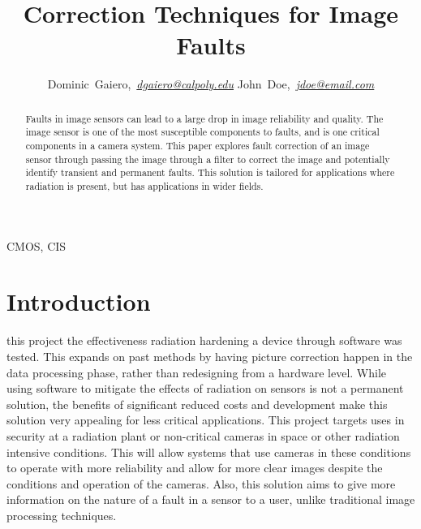 \documentclass[journal]{IEEEtran}
\begin{document}
\title{Correction Techniques for Image Faults}

\author{Dominic~Gaiero,~\textit{\href{mailto:dgaiero@calpoly.edu}{dgaiero@calpoly.edu}}
        John~Doe,~\textit{\href{mailto:jdoe@email.com}{jdoe@email.com}}}

\maketitle

\begin{abstract}
Faults in image sensors can lead to a large drop in image reliability and quality.  The image sensor is one of the most susceptible components to faults, and is one critical components in a camera system.  This paper explores fault correction of an image sensor through passing the image through a filter to correct the image and potentially identify transient and permanent faults.  This solution is tailored for applications where radiation is present, but has applications in wider fields.  
\end{abstract}



\begin{IEEEkeywords}
CMOS, CIS
\end{IEEEkeywords}

\section{Introduction}%
 this project the effectiveness radiation hardening a device through software was tested.  This expands on past methods by having picture correction happen in the data processing phase, rather than redesigning from a hardware level. While using software to mitigate the effects of radiation on sensors is not a permanent solution, the benefits of significant reduced costs and development make this solution very appealing for less critical applications. This project targets uses in security at a radiation plant or non-critical cameras in space or other radiation intensive conditions. This will allow systems that use cameras in these conditions to operate with more reliability and allow for more clear images despite the conditions and operation of the cameras.  Also, this solution aims to give more information on the nature of a fault in a sensor to a user, unlike traditional image processing techniques.
\end{document}
